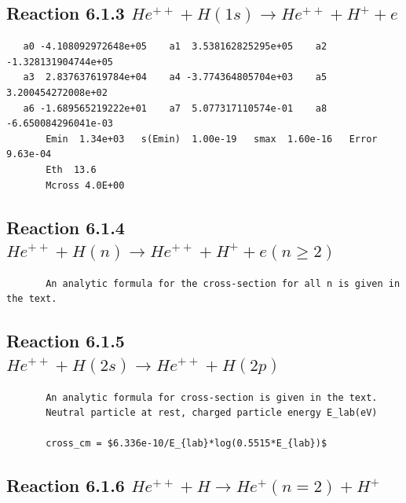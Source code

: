 \documentclass[12pt,dvipdfmx]{article}
\begin{document}
\newpage
\subsection{
Reaction 6.1.3 $   He^{++} + H(1s) \rightarrow He^{++} + H^+ + e$}


\begin{small}\begin{verbatim}
   a0 -4.108092972648e+05    a1  3.538162825295e+05    a2 -1.328131904744e+05
   a3  2.837637619784e+04    a4 -3.774364805704e+03    a5  3.200454272008e+02
   a6 -1.689565219222e+01    a7  5.077317110574e-01    a8 -6.650084296041e-03
       Emin  1.34e+03   s(Emin)  1.00e-19   smax  1.60e-16   Error 9.63e-04
       Eth  13.6
       Mcross 4.0E+00
\end{verbatim}\end{small}

\newpage
\subsection{
Reaction 6.1.4 $   He^{++} + H(n) \rightarrow  He^{++} + H^+ + e   (n \geq 2)$}

\begin{small}\begin{verbatim}
       An analytic formula for the cross-section for all n is given in the text.
\end{verbatim}\end{small}

\newpage
\subsection{
Reaction 6.1.5 $   He^{++} + H(2s) \rightarrow  He^{++} + H(2p)   $}

\begin{small}\begin{verbatim}
       An analytic formula for cross-section is given in the text.
       Neutral particle at rest, charged particle energy E_lab(eV)

       cross_cm = $6.336e-10/E_{lab}*log(0.5515*E_{lab})$
\end{verbatim}\end{small}

\newpage
\subsection{
Reaction 6.1.6 $   He^{++} + H \rightarrow He^+(n=2) + H^+$}
\end{document}
